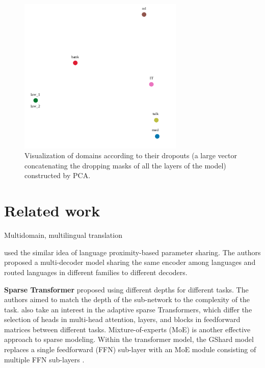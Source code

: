 \documentclass[11pt]{article}
\begin{document}
\begin{figure}[htbp]
\includegraphics[width=0.7\textwidth]{multi_domain}
\caption{Visualization of domains according to their dropouts (a large vector concatenating the dropping masks of all the layers of the model) constructed by PCA.}
\label{fig:domain}
\end{figure}

\section{Related work}
Multidomain, multilingual translation 

\citep{sen19multilingual,kong21multilingual} used the similar idea of language proximity-based parameter sharing. The authors proposed a multi-decoder model sharing the same encoder among languages and routed languages in different families to different decoders.

\textbf{Sparse Transformer}\citet{xian20deep} proposed using different depths for different tasks. The authors aimed to match the depth of the sub-network to the complexity of the task. \citet{Gong21pay,Gong21adaptive} also take an interest in the adaptive sparse Transformers, which differ the selection of heads in multi-head attention, layers, and blocks in feedforward matrices between different tasks. Mixture-of-experts (MoE) is another effective approach to sparse modeling. Within the transformer model, the GShard model replaces a single feedforward (FFN) sub-layer with an MoE module consisting of multiple FFN sub-layers \citep{lepikhin21gshard}. \citet{william21switch} 
\end{document}
